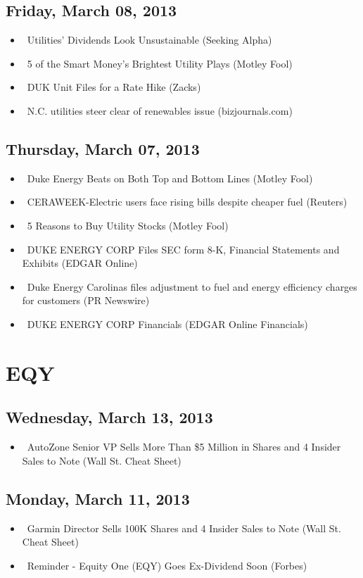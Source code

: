 \documentclass[11pt,asymmetric]{article}
\begin{document}
\subsection*{Friday, March 08, 2013}
\begin{itemize}
\item\ Utilities' Dividends Look Unsustainable (Seeking Alpha)
\item\ 5 of the Smart Money’s Brightest Utility Plays (Motley Fool)
\item\ DUK Unit Files for a Rate Hike (Zacks)
\item\ N.C. utilities steer clear of renewables issue (bizjournals.com)
\end{itemize}
\subsection*{Thursday, March 07, 2013}
\begin{itemize}
\item\ Duke Energy Beats on Both Top and Bottom Lines (Motley Fool)
\item\ CERAWEEK-Electric users face rising bills despite cheaper fuel (Reuters)
\item\ 5 Reasons to Buy Utility Stocks (Motley Fool)
\item\ DUKE ENERGY CORP Files SEC form 8-K, Financial Statements and Exhibits (EDGAR Online)
\item\ Duke Energy Carolinas files adjustment to fuel and energy efficiency charges for customers (PR Newswire)
\item\ DUKE ENERGY CORP Financials (EDGAR Online Financials)
\end{itemize}

\section*{EQY}

\subsection*{Wednesday, March 13, 2013}
\begin{itemize}
\item\ AutoZone Senior VP Sells More Than \$5 Million in Shares and 4 Insider Sales to Note (Wall St. Cheat Sheet)
\end{itemize}
\subsection*{Monday, March 11, 2013}
\begin{itemize}
\item\ Garmin Director Sells 100K Shares and 4 Insider Sales to Note (Wall St. Cheat Sheet)
\item\ Reminder - Equity One (EQY) Goes Ex-Dividend Soon (Forbes)
\end{itemize}
\end{document}
